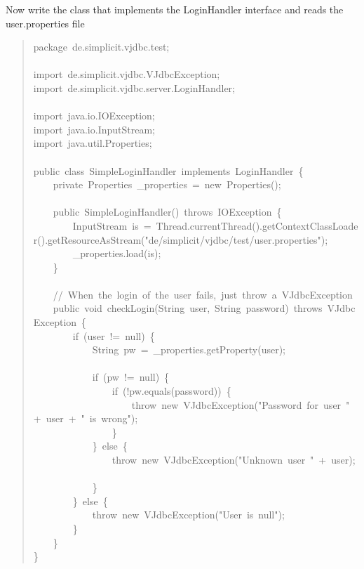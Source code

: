 \documentclass[10pt,a4paper,english]{article}
\begin{document}
Now write the class that implements the LoginHandler interface and reads the user.properties file
\begin{quote}{\ttfamily \raggedright \noindent
package~de.simplicit.vjdbc.test;~\\
~\\
import~de.simplicit.vjdbc.VJdbcException;~\\
import~de.simplicit.vjdbc.server.LoginHandler;~\\
~\\
import~java.io.IOException;~\\
import~java.io.InputStream;~\\
import~java.util.Properties;~\\
~\\
public~class~SimpleLoginHandler~implements~LoginHandler~{\{}~\\
~~~~private~Properties~{\_}properties~=~new~Properties();~\\
~\\
~~~~public~SimpleLoginHandler()~throws~IOException~{\{}~\\
~~~~~~~~InputStream~is~=~Thread.currentThread().getContextClassLoader().getResourceAsStream("de/simplicit/vjdbc/test/user.properties");~\\
~~~~~~~~{\_}properties.load(is);~\\
~~~~{\}}~\\
~\\
~~~~//~When~the~login~of~the~user~fails,~just~throw~a~VJdbcException~\\
~~~~public~void~checkLogin(String~user,~String~password)~throws~VJdbcException~{\{}~\\
~~~~~~~~if~(user~!=~null)~{\{}~\\
~~~~~~~~~~~~String~pw~=~{\_}properties.getProperty(user);~\\
~\\
~~~~~~~~~~~~if~(pw~!=~null)~{\{}~\\
~~~~~~~~~~~~~~~~if~(!pw.equals(password))~{\{}~\\
~~~~~~~~~~~~~~~~~~~~throw~new~VJdbcException("Password~for~user~"~+~user~+~"~is~wrong");~\\
~~~~~~~~~~~~~~~~{\}}~\\
~~~~~~~~~~~~{\}}~else~{\{}~\\
~~~~~~~~~~~~~~~~throw~new~VJdbcException("Unknown~user~"~+~user);~\\
~~~~~~~~~~~~{\}}~\\
~~~~~~~~{\}}~else~{\{}~\\
~~~~~~~~~~~~throw~new~VJdbcException("User~is~null");~\\
~~~~~~~~{\}}~\\
~~~~{\}}~\\
{\}}
}\end{quote}
\end{document}
